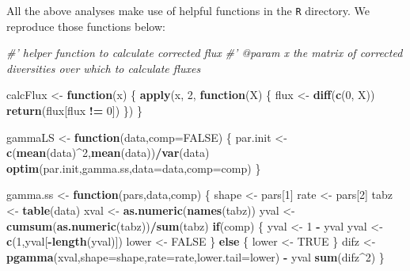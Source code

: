 \documentclass[]{article}
\newenvironment{Shaded}{\begin{snugshade}}{\end{snugshade}}
\newcommand{\KeywordTok}[1]{\textcolor[rgb]{0.13,0.29,0.53}{\textbf{#1}}}
\newcommand{\DataTypeTok}[1]{\textcolor[rgb]{0.13,0.29,0.53}{#1}}
\newcommand{\DecValTok}[1]{\textcolor[rgb]{0.00,0.00,0.81}{#1}}
\newcommand{\StringTok}[1]{\textcolor[rgb]{0.31,0.60,0.02}{#1}}
\newcommand{\CommentTok}[1]{\textcolor[rgb]{0.56,0.35,0.01}{\textit{#1}}}
\newcommand{\OtherTok}[1]{\textcolor[rgb]{0.56,0.35,0.01}{#1}}
\newcommand{\ControlFlowTok}[1]{\textcolor[rgb]{0.13,0.29,0.53}{\textbf{#1}}}
\newcommand{\OperatorTok}[1]{\textcolor[rgb]{0.81,0.36,0.00}{\textbf{#1}}}
\newcommand{\NormalTok}[1]{#1}
\begin{document}
All the above analyses make use of helpful functions in the \texttt{R}
directory. We reproduce those functions below:

\begin{Shaded}
\begin{Highlighting}[]
\CommentTok{#' helper function to calculate corrected flux}
\CommentTok{#' @param x the matrix of corrected diversities over which to calculate fluxes}

\NormalTok{calcFlux <-}\StringTok{ }\ControlFlowTok{function}\NormalTok{(x) \{}
    \KeywordTok{apply}\NormalTok{(x, }\DecValTok{2}\NormalTok{, }\ControlFlowTok{function}\NormalTok{(X) \{}
\NormalTok{        flux <-}\StringTok{ }\KeywordTok{diff}\NormalTok{(}\KeywordTok{c}\NormalTok{(}\DecValTok{0}\NormalTok{, X))}
        \KeywordTok{return}\NormalTok{(flux[flux }\OperatorTok{!=}\StringTok{ }\DecValTok{0}\NormalTok{])}
\NormalTok{    \})}
\NormalTok{\}}
\end{Highlighting}
\end{Shaded}

\begin{Shaded}
\begin{Highlighting}[]
\NormalTok{gammaLS <-}\StringTok{ }\ControlFlowTok{function}\NormalTok{(data,}\DataTypeTok{comp=}\OtherTok{FALSE}\NormalTok{) \{}
\NormalTok{    par.init <-}\StringTok{ }\KeywordTok{c}\NormalTok{(}\KeywordTok{mean}\NormalTok{(data)}\OperatorTok{^}\DecValTok{2}\NormalTok{,}\KeywordTok{mean}\NormalTok{(data))}\OperatorTok{/}\KeywordTok{var}\NormalTok{(data)}
    \KeywordTok{optim}\NormalTok{(par.init,gamma.ss,}\DataTypeTok{data=}\NormalTok{data,}\DataTypeTok{comp=}\NormalTok{comp)}
\NormalTok{\}}

\NormalTok{gamma.ss <-}\StringTok{ }\ControlFlowTok{function}\NormalTok{(pars,data,comp) \{}
\NormalTok{    shape <-}\StringTok{ }\NormalTok{pars[}\DecValTok{1}\NormalTok{]}
\NormalTok{    rate <-}\StringTok{ }\NormalTok{pars[}\DecValTok{2}\NormalTok{]}
\NormalTok{    tabz <-}\StringTok{ }\KeywordTok{table}\NormalTok{(data)}
\NormalTok{    xval <-}\StringTok{ }\KeywordTok{as.numeric}\NormalTok{(}\KeywordTok{names}\NormalTok{(tabz))}
\NormalTok{    yval <-}\StringTok{ }\KeywordTok{cumsum}\NormalTok{(}\KeywordTok{as.numeric}\NormalTok{(tabz))}\OperatorTok{/}\KeywordTok{sum}\NormalTok{(tabz)}
    \ControlFlowTok{if}\NormalTok{(comp) \{}
\NormalTok{        yval <-}\StringTok{ }\DecValTok{1} \OperatorTok{-}\StringTok{ }\NormalTok{yval}
\NormalTok{        yval <-}\StringTok{ }\KeywordTok{c}\NormalTok{(}\DecValTok{1}\NormalTok{,yval[}\OperatorTok{-}\KeywordTok{length}\NormalTok{(yval)])}
\NormalTok{        lower <-}\StringTok{ }\OtherTok{FALSE}
\NormalTok{    \} }\ControlFlowTok{else}\NormalTok{ \{}
\NormalTok{        lower <-}\StringTok{ }\OtherTok{TRUE}
\NormalTok{    \}}
\NormalTok{    difz <-}\StringTok{ }\KeywordTok{pgamma}\NormalTok{(xval,}\DataTypeTok{shape=}\NormalTok{shape,}\DataTypeTok{rate=}\NormalTok{rate,}\DataTypeTok{lower.tail=}\NormalTok{lower) }\OperatorTok{-}\StringTok{ }\NormalTok{yval}
    \KeywordTok{sum}\NormalTok{(difz}\OperatorTok{^}\DecValTok{2}\NormalTok{)}
\NormalTok{\}}
\end{Highlighting}
\end{Shaded}
\end{document}
